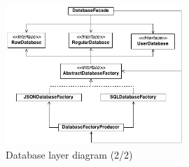 \begin{figure}[h!]
    \caption{Database layer diagram (2/2)}
    \centering
    \includegraphics[width=0.6\textwidth]{images/db_fact_diag.png}
\end{figure}


\newpage
